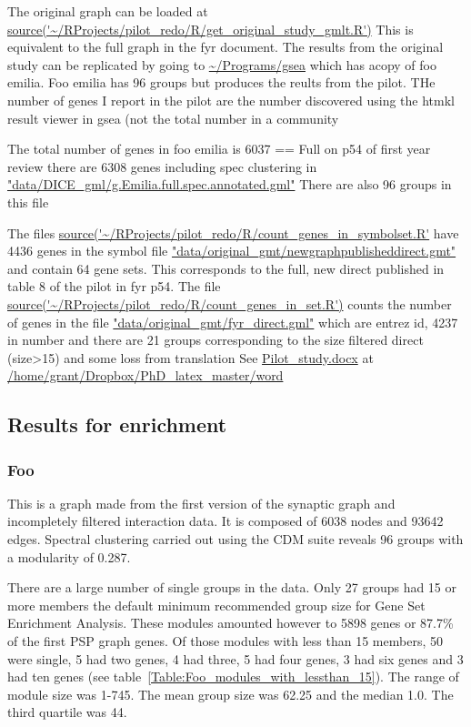 
The original graph can be loaded at \url{source('~/RProjects/pilot_redo/R/get_original_study_gmlt.R')}
This is equivalent to the full graph in the fyr document. The results from the original study can be replicated by going to 
\url{~/Programs/gsea} which has acopy of foo emilia. Foo emilia has 96 groups but produces the reults from the pilot. THe number of genes I report in the pilot are the number discovered using the htmkl result viewer in gsea (not the total number in a community

The total number of genes in foo emilia is  6037
== Full on p54 of first year review
there are 6308 genes including spec clustering in \url{"data/DICE_gml/g.Emilia.full.spec.annotated.gml"}
There are also 96 groups in this file 

The files \url{source('~/RProjects/pilot_redo/R/count_genes_in_symbolset.R'} have 4436 genes in the symbol file \url{"data/original_gmt/newgraphpublisheddirect.gmt"} and contain 64 gene sets. This corresponds to the full, new direct published in table 8 of the pilot in fyr p54. The file \url{source('~/RProjects/pilot_redo/R/count_genes_in_set.R')} counts the number of genes in the file \url{"data/original_gmt/fyr_direct.gml"} which are entrez id, 4237 in number and there are 21 groups corresponding to the size filtered direct (size>15) and some loss from translation
See \url{Pilot_study.docx} at \url{/home/grant/Dropbox/PhD_latex_master/word}

\subsection{Results for enrichment}
\subsubsection{Foo}

This is a graph made from the first version of the synaptic graph and incompletely filtered interaction data. It is composed of 6038 nodes and 93642 edges. Spectral clustering carried out using the CDM suite reveals 96 groups with a modularity of 0.287.

There are a large number of single groups in the data. Only 27 groups had 15 or more members the default minimum recommended group size for Gene Set Enrichment Analysis. These modules amounted however to 5898 genes or 87.7\% of the first PSP graph genes. Of those modules with less than 15 members, 50 were single, 5 had two genes, 4 had three, 5 had four genes, 3 had six genes and 3 had ten genes (see table~\ref{Table:Foo_modules_with_lessthan_15}). The range of module size was 1-745. The mean group size was 62.25 and the median 1.0. The third quartile was 44.

